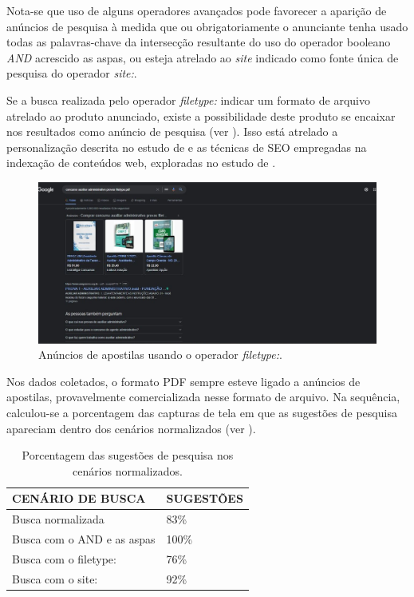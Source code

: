 \documentclass[portuguese]{textolivre}
\begin{document}
Nota-se que uso de alguns operadores avançados pode favorecer a aparição de anúncios de pesquisa à medida que ou obrigatoriamente o anunciante tenha usado todas as palavras-chave da intersecção resultante do uso do operador booleano \textit{AND} acrescido as aspas, ou esteja atrelado ao \textit{site} indicado como fonte única de pesquisa do operador \textit{site:}.

Se a busca realizada pelo operador \textit{filetype:} indicar um formato de arquivo atrelado ao produto anunciado, existe a possibilidade deste produto se encaixar nos resultados como anúncio de pesquisa (ver ). Isso está atrelado a personalização descrita no estudo de \textcite{rosa_publicidade_2022} e as técnicas de SEO empregadas na indexação de conteúdos web, exploradas no estudo de \textcite{camossi_conceito_2023}.

\begin{figure}[h!]
    \centering
    \includegraphics[width=0.8\linewidth]{fig-018.jpg}
    \caption{Anúncios de apostilas usando o operador \textit{filetype:}.}
    \label{fig22}
\end{figure}

Nos dados coletados, o formato PDF sempre esteve ligado a anúncios de apostilas, provavelmente comercializada nesse formato de arquivo. Na sequência, calculou-se a porcentagem das capturas de tela em que as sugestões de pesquisa apareciam dentro dos cenários normalizados (ver ).

\begin{table}[h!]
\centering
\begin{threeparttable}
\caption{Porcentagem das sugestões de pesquisa nos cenários normalizados.}
\label{tab04}
\begin{tabular}{l l}
\toprule
 \textbf{CENÁRIO DE BUSCA} & \textbf{SUGESTÕES} \\
 \midrule
Busca normalizada & 83\% \\
Busca com o AND e as aspas & 100\% \\
Busca com o filetype: & 76\% \\
Busca com o site: & 92\% \\
\bottomrule
\end{tabular}
\end{threeparttable}
\end{table}
\end{document}
